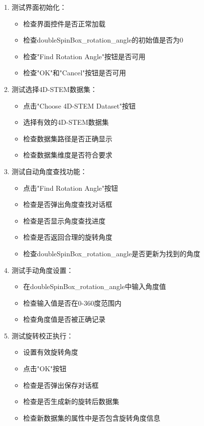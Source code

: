 \documentclass[a4paper,12pt]{report}	%
\begin{document}
\begin{enumerate}
    \item 测试界面初始化：
    \begin{itemize}
        \item 检查界面控件是否正常加载
        \item 检查doubleSpinBox\_rotation\_angle的初始值是否为0
        \item 检查"Find Rotation Angle"按钮是否可用
        \item 检查"OK"和"Cancel"按钮是否可用
    \end{itemize}

    \item 测试选择4D-STEM数据集：
    \begin{itemize}
        \item 点击"Choose 4D-STEM Dataset"按钮
        \item 选择有效的4D-STEM数据集
        \item 检查数据集路径是否正确显示
        \item 检查数据集维度是否符合要求
    \end{itemize}

    \item 测试自动角度查找功能：
    \begin{itemize}
        \item 点击"Find Rotation Angle"按钮
        \item 检查是否弹出角度查找对话框
        \item 检查是否显示角度查找进度
        \item 检查是否返回合理的旋转角度
        \item 检查doubleSpinBox\_rotation\_angle是否更新为找到的角度
    \end{itemize}

    \item 测试手动角度设置：
    \begin{itemize}
        \item 在doubleSpinBox\_rotation\_angle中输入角度值
        \item 检查输入值是否在0-360度范围内
        \item 检查角度值是否被正确记录
    \end{itemize}

    \item 测试旋转校正执行：
    \begin{itemize}
        \item 设置有效旋转角度
        \item 点击"OK"按钮
        \item 检查是否弹出保存对话框
        \item 检查是否生成新的旋转后数据集
        \item 检查新数据集的属性中是否包含旋转角度信息
    \end{itemize}


\end{enumerate}
\end{document}
